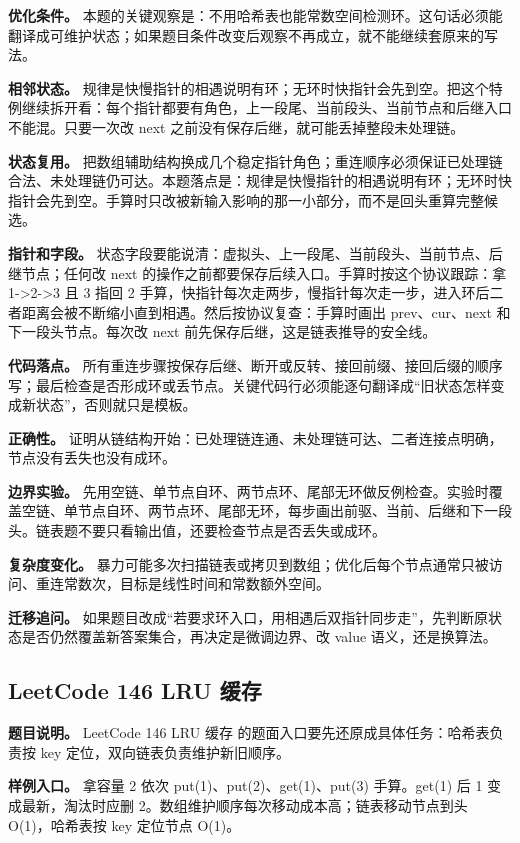 \textbf{优化条件。} 本题的关键观察是：不用哈希表也能常数空间检测环。这句话必须能翻译成可维护状态；如果题目条件改变后观察不再成立，就不能继续套原来的写法。

\textbf{相邻状态。} 规律是快慢指针的相遇说明有环；无环时快指针会先到空。把这个特例继续拆开看：每个指针都要有角色，上一段尾、当前段头、当前节点和后继入口不能混。只要一次改 next 之前没有保存后继，就可能丢掉整段未处理链。

\textbf{状态复用。} 把数组辅助结构换成几个稳定指针角色；重连顺序必须保证已处理链合法、未处理链仍可达。本题落点是：规律是快慢指针的相遇说明有环；无环时快指针会先到空。手算时只改被新输入影响的那一小部分，而不是回头重算完整候选。

\textbf{指针和字段。} 状态字段要能说清：虚拟头、上一段尾、当前段头、当前节点、后继节点；任何改 next 的操作之前都要保存后续入口。手算时按这个协议跟踪：拿 1->2->3 且 3 指回 2 手算，快指针每次走两步，慢指针每次走一步，进入环后二者距离会被不断缩小直到相遇。然后按协议复查：手算时画出 prev、cur、next 和下一段头节点。每次改 next 前先保存后继，这是链表推导的安全线。

\textbf{代码落点。} 所有重连步骤按保存后继、断开或反转、接回前缀、接回后缀的顺序写；最后检查是否形成环或丢节点。关键代码行必须能逐句翻译成“旧状态怎样变成新状态”，否则就只是模板。

\textbf{正确性。} 证明从链结构开始：已处理链连通、未处理链可达、二者连接点明确，节点没有丢失也没有成环。

\textbf{边界实验。} 先用空链、单节点自环、两节点环、尾部无环做反例检查。实验时覆盖空链、单节点自环、两节点环、尾部无环，每步画出前驱、当前、后继和下一段头。链表题不要只看输出值，还要检查节点是否丢失或成环。

\textbf{复杂度变化。} 暴力可能多次扫描链表或拷贝到数组；优化后每个节点通常只被访问、重连常数次，目标是线性时间和常数额外空间。

\textbf{迁移追问。} 如果题目改成“若要求环入口，用相遇后双指针同步走”，先判断原状态是否仍然覆盖新答案集合，再决定是微调边界、改 value 语义，还是换算法。

\subsection{LeetCode 146 LRU 缓存}

\textbf{题目说明。} LeetCode 146 LRU 缓存 的题面入口要先还原成具体任务：哈希表负责按 key 定位，双向链表负责维护新旧顺序。

\textbf{样例入口。} 拿容量 2 依次 put(1)、put(2)、get(1)、put(3) 手算。get(1) 后 1 变成最新，淘汰时应删 2。数组维护顺序每次移动成本高；链表移动节点到头 O(1)，哈希表按 key 定位节点 O(1)。

